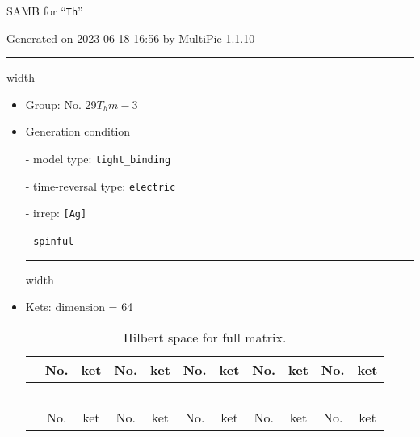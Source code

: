 \documentclass[fleqn,10pt,landscape]{article}
\begin{document}
\setcounter{MaxMatrixCols}{16}

\setlength{\baselineskip}{16pt}
\footnotesize
\begin{center}
\LARGE
SAMB for ``\texttt{Th}''
\end{center}
\begin{flushright}
Generated on 2023-06-18 16:56 by MultiPie 1.1.10
\end{flushright}
\vspace{1cm}


 \hfil \hrule height 1mm width \textwidth \hfil

\begin{itemize}
\item Group: No. 29\quad$T_{h}$\quad$m-3$\quad[ cubic ]

\vspace{5mm}

\item Generation condition

\quad - model type: \texttt{tight_binding}

\quad - time-reversal type: \texttt{electric}

\quad - irrep: \texttt{[Ag]}

\quad - \texttt{spinful}


 \hfil \hrule height 1mm width \textwidth \hfil

\item Kets: dimension = 64
\begin{center}
\renewcommand{\arraystretch}{1.3}
\begin{longtable}{c|cc|cc|cc|cc|cc}
\caption{Hilbert space for full matrix.}
 \\
 \hline \hline
 & No. & ket & No. & ket & No. & ket & No. & ket & No. & ket \\ \hline \endfirsthead

\multicolumn{10}{l}{\tablename\ \thetable{}} \\
 \hline \hline
 & No. & ket & No. & ket & No. & ket & No. & ket & No. & ket \\ \hline \endhead


\end{longtable}
\end{center}
\end{itemize}
\end{document}
